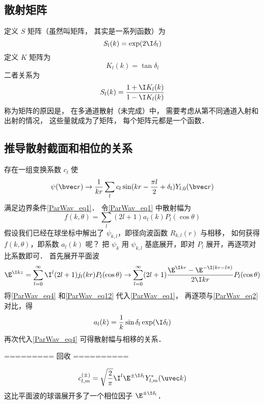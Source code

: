 \subsection{散射矩阵}
定义 $S$ 矩阵（虽然叫矩阵， 其实是一系列函数）为
\begin{equation}
S_l(k) = \exp(2\I\delta_l)
\end{equation}
定义 $K$ 矩阵为
\begin{equation}
K_l(k) = \tan \delta_l
\end{equation}
二者关系为
\begin{equation}
S_l(k) = \frac{1 + \I K_l(k)}{1 - \I K_l(k)}
\end{equation}
称为矩阵的原因是， 在多通道散射（未完成）中， 需要考虑从第不同通道入射和出射的情况， 这些量就成为了矩阵， 每个矩阵元都是一个函数．

\subsection{推导散射截面和相位的关系}
存在一组变换系数 $c_l$ 使
\begin{equation}\label{ParWav_eq2}
\psi(\bvec r) \rightarrow \frac{1}{kr} \sum_l c_l \sin(kr - \frac{\pi l}{2} + \delta_l) Y_{l,0}(\bvec r)
\end{equation}
满足边界条件\autoref{ParWav_eq1}． 令\autoref{ParWav_eq1} 中散射幅为
\begin{equation}\label{ParWav_eq4}
f(k,\theta) = \sum_l (2l + 1) a_l(k) P_l(\cos \theta)
\end{equation}
假设我们已经在球坐标中解出了 $\psi_{k,l}$，即径向波函数 $R_{k,l}(r)$ 与相移， 如何获得 $f(k,\theta )$，即系数 $a_l(k)$ 呢？ 把 $\psi_k$ 用 $\psi_{k,l}$ 基底展开，即对 $P_l$ 展开，再逐项对比系数即可． 首先展开平面波
\begin{equation}\label{ParWav_eq12}
\E^{\I kz} = \sum_{l = 0}^\infty  \I^l (2l + 1) j_l(kr) P_l(\cos \theta) \rightarrow \sum_{l=0}^\infty  (2l + 1)\frac{\E^{\I kr} - \E^{-\I(kr - l\pi)}}{2\I kr} P_l(\cos \theta)
\end{equation}
将\autoref{ParWav_eq4} 和\autoref{ParWav_eq12} 代入\autoref{ParWav_eq1}， 再逐项与\autoref{ParWav_eq2} 对比，得
\begin{equation}
a_l(k) = \frac{1}{k} \sin\delta_l \exp(\I \delta_l)
\end{equation}
再次代入\autoref{ParWav_eq4} 可得散射幅与相移的关系．

========= 回收 ==========

\begin{equation}
c_{l,m}^{(\pm)} = \sqrt{\frac{2}{\pi}} \I^l \E^{\pm \I \delta_l} Y_{l,m}^*(\uvec k)
\end{equation}
这比平面波的球谐展开多了一个相位因子 $\E^{\pm \I \delta_l}$．

